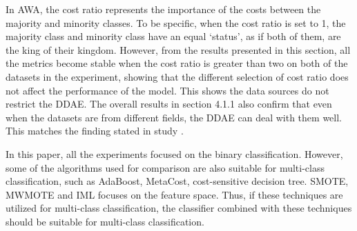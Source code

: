 In AWA, the cost ratio represents the importance of the costs between the majority and minority classes. To be specific, when the cost ratio is set to 1, the majority class and minority class have an equal ‘status’, as if both of them, are the king of their kingdom. However, from the results presented in this section, all the metrics become stable when the cost ratio is greater than two on both of the datasets in the experiment, showing that the different selection of cost ratio does not affect the performance of the model. This shows the data sources do not restrict the DDAE. The overall results in section 4.1.1 also confirm that even when the datasets are from different fields, the DDAE can deal with them well. This matches the finding stated in study \cite{73}.

In this paper, all the experiments focused on the binary classification. However, some of the algorithms used for comparison are also suitable for multi-class classification, such as AdaBoost, MetaCost, cost-sensitive decision tree. SMOTE, MWMOTE and IML focuses on the feature space. Thus, if these techniques are utilized for multi-class classification, the classifier combined with these techniques should be suitable for multi-class classification.

